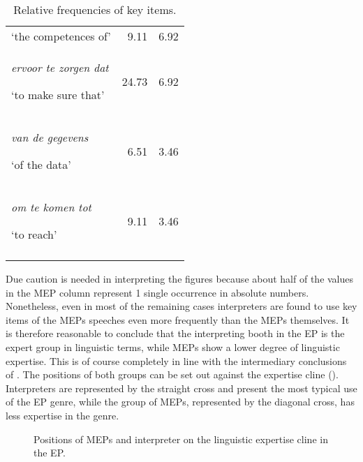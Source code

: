 \documentclass[output=paper]{langscibook}
\begin{document}
\begin{table}
\begin{tabularx}{\textwidth}{Xrr}
‘the competences of’ &  9.11 &  6.92\\
\rule{0pt}{1.2em}\textit{ervoor te zorgen dat} 

‘to make sure that’ &  24.73 &  6.92\\
\rule{0pt}{1.2em}{\itshape van de gegevens} 

‘of the data’ &  6.51 &  3.46\\
\rule{0pt}{1.2em}\textit{om te komen tot} 

‘to reach’ &  9.11 &  3.46\\
\lspbottomrule
\end{tabularx}

\caption{Relative frequencies of key items.}
\label{tab:defrancq:2}
\end{table}

Due caution is needed in interpreting the figures because about half of the values in the MEP column represent 1 single occurrence in absolute numbers. Nonetheless, even in most of the remaining cases interpreters are found to use key items of the MEPs speeches even more frequently than the MEPs themselves. It is therefore reasonable to conclude that the interpreting booth in the EP is the expert group in linguistic terms, while MEPs show a lower degree of linguistic expertise. This is of course completely in line with the intermediary conclusions of . The positions of both groups can be set out against the expertise cline (). Interpreters are represented by the straight cross and present the most typical use of the EP genre, while the group of MEPs, represented by the diagonal cross, has less expertise in the genre.

\begin{figure}


\caption{Positions of MEPs and interpreter on the linguistic expertise cline in the EP.}
\label{fig:defrancq:3}
\end{figure}
\end{document}
